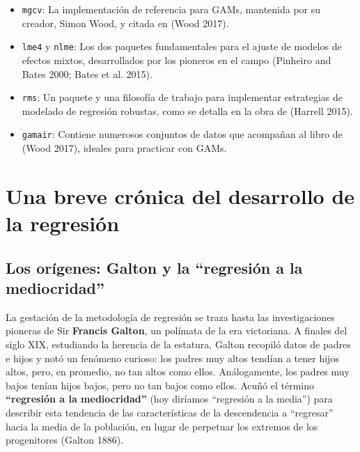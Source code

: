 \documentclass[
  letterpaper,
  DIV=11,
  numbers=noendperiod]{scrreprt}
\providecommand{\tightlist}{%
  \setlength{\itemsep}{0pt}\setlength{\parskip}{0pt}}
\begin{document}
\begin{tcolorbox}
\begin{itemize}
\tightlist
\item
  \texttt{mgcv}: La implementación de referencia para GAMs, mantenida
  por su creador, Simon Wood, y citada en (Wood 2017).
\item
  \texttt{lme4} y \texttt{nlme}: Los dos paquetes fundamentales para el
  ajuste de modelos de efectos mixtos, desarrollados por los pioneros en
  el campo (Pinheiro and Bates 2000; Bates et al. 2015).
\item
  \texttt{rms}: Un paquete y una filosofía de trabajo para implementar
  estrategias de modelado de regresión robustas, como se detalla en la
  obra de (Harrell 2015).
\item
  \texttt{gamair}: Contiene numerosos conjuntos de datos que acompañan
  al libro de (Wood 2017), ideales para practicar con GAMs.
\end{itemize}

\end{tcolorbox}

\section{Una breve crónica del desarrollo de la
regresión}\label{sec-historia}

\subsection{Los orígenes: Galton y la ``regresión a la
mediocridad''}\label{los-oruxedgenes-galton-y-la-regresiuxf3n-a-la-mediocridad}

La gestación de la metodología de regresión se traza hasta las
investigaciones pioneras de Sir \textbf{Francis Galton}, un polímata de
la era victoriana. A finales del siglo XIX, estudiando la herencia de la
estatura, Galton recopiló datos de padres e hijos y notó un fenómeno
curioso: los padres muy altos tendían a tener hijos altos, pero, en
promedio, no tan altos como ellos. Análogamente, los padres muy bajos
tenían hijos bajos, pero no tan bajos como ellos. Acuñó el término
\textbf{``regresión a la mediocridad''} (hoy diríamos ``regresión a la
media'') para describir esta tendencia de las características de la
descendencia a ``regresar'' hacia la media de la población, en lugar de
perpetuar los extremos de los progenitores (Galton 1886).
\end{document}
